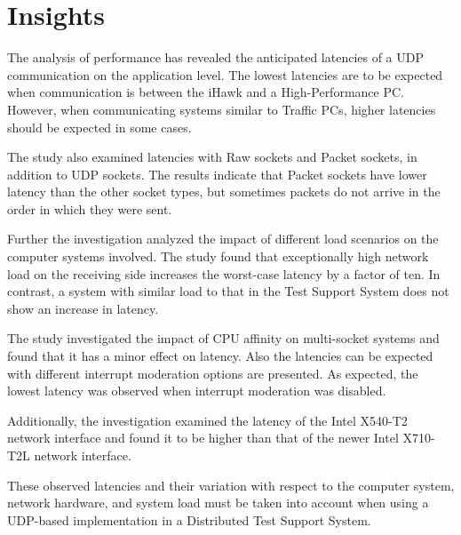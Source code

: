 \section{Insights}
The analysis of performance has revealed the anticipated latencies of a UDP communication on the application level. The lowest latencies are to be expected when communication is between the iHawk and a High-Performance PC. However, when communicating systems similar to Traffic PCs, higher latencies should be expected in some cases.

The study also examined latencies with Raw sockets and Packet sockets, in addition to UDP sockets. The results indicate that Packet sockets have lower latency than the other socket types, but sometimes packets do not arrive in the order in which they were sent.

Further the investigation analyzed the impact of different load scenarios on the computer systems involved. The study found that exceptionally high network load on the receiving side increases the worst-case latency by a factor of ten. In contrast, a system with similar load to that in the Test Support System does not show an increase in latency.

The study investigated the impact of CPU affinity on multi-socket systems and found that it has a minor effect on latency. Also the latencies can be expected with different interrupt moderation options are presented. As expected, the lowest latency was observed when interrupt moderation was disabled. 

Additionally, the investigation examined the latency of the Intel X540-T2 network interface and found it to be higher than that of the newer Intel X710-T2L network interface.

These observed latencies and their variation with respect to the computer system, network hardware, and system load must be taken into account when using a UDP-based implementation in a Distributed Test Support System.
